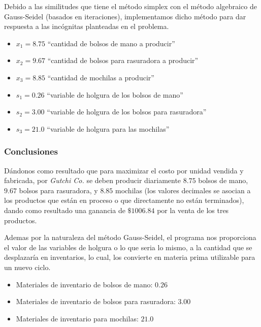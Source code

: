 \documentclass[conference]{IEEEtran}
\begin{document}
Debido a las similitudes que tiene el método simplex con el método
algebraico de Gauss-Seidel (basados en iteraciones), implementamos dicho
método para dar respuesta a las incógnitas planteadas en el problema.

\begin{itemize}
    \item $x_{1} = 8.75$ ``cantidad de bolsos de mano a producir''
    \item $x_{2} = 9.67$ ``cantidad de bolsos para rasuradora a producir''
    \item $x_{3} = 8.85$ ``cantidad de mochilas a producir''
    \item $s_{1} = 0.26$ ``variable de holgura de los bolsos de mano''
    \item $s_{2} = 3.00$ ``variable de holgura de los bolsos para rasuradora''
    \item $s_{3} = 21.0$ ``variable de holgura para las mochilas''
\end{itemize}

\subsubsection*{Conclusiones}

Dándonos como resultado que para maximizar el costo por unidad vendida y
fabricada, por \textit{Gutchi Co.} se deben producir diariamente $8.75$ bolsos de mano,
$9.67$ bolsos para rasuradora, y $8.85$ mochilas (los valores decimales
se asocian a los productos que están en proceso o que directamente
no están terminados), dando como resultado una ganancia de $\$1006.84$ por
la venta de los tres productos.

Ademas por la naturaleza del método Gauss-Seidel, el programa nos proporciona
el valor de las variables de holgura o lo que seria lo mismo, a la cantidad
que se desplazaría en inventarios, lo cual, los convierte en materia
prima utilizable para un nuevo ciclo.

\begin{itemize}
    \item Materiales de inventario de bolsos de mano: $0.26$
    \item Materiales de inventario de bolsos para rasuradora: $3.00$
    \item Materiales de inventario para mochilas: $21.0$
\end{itemize}


\end{document}
